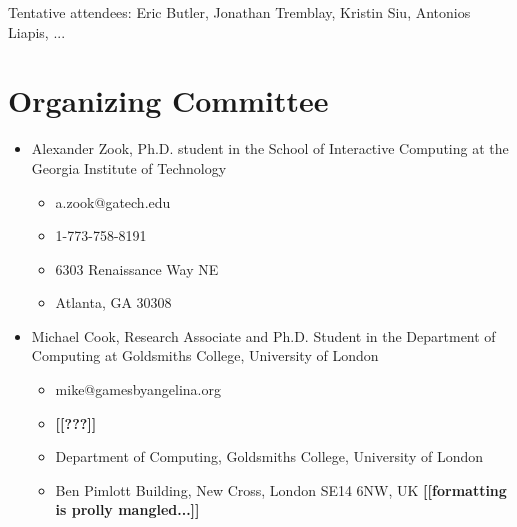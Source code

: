 \documentclass[10pt,a4paper]{article}
\newcommand{\mytodo}[1]{\textbf{[[#1]]}}
\begin{document}
Tentative attendees: Eric Butler, Jonathan Tremblay, Kristin Siu, Antonios Liapis, ...



\section{Organizing Committee}
\begin{itemize}
\item Alexander Zook, Ph.D. student in the School of Interactive Computing at the Georgia Institute of Technology
\begin{itemize}
\item a.zook@gatech.edu
\item 1-773-758-8191
\item 6303 Renaissance Way NE
\item Atlanta, GA 30308
\end{itemize}
\item Michael Cook, Research Associate and Ph.D. Student in the Department of Computing at Goldsmiths College, University of London
\begin{itemize}
\item mike@gamesbyangelina.org
\item \mytodo{???}
\item Department of Computing, Goldsmiths College, University of London
\item Ben Pimlott Building, New Cross, London SE14 6NW, UK \mytodo{formatting is prolly mangled...}
\end{itemize}
\end{itemize}
\end{document}
